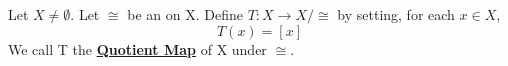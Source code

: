 \label{df:quotient_map}
\newcommand{\QuotientMap}[0]{\textbf{\hyperref[df:quotient_map]{Quotient Map}}\xspace}
    
 \newcommand{\QuotientMapInstance}[3]{ #1 : #2\to #2/#3 }
\begin{df}

    Let $X \neq \emptyset$.
    Let $\cong$ be an 
	\EquivalenceRelation 
	on X.
    Define $T:X \to X/\cong$ by setting, for each $x \in X$, 
    \begin{equation}
        T(x)=[x]
    \end{equation}    
    We call T the \QuotientMap of X under $\cong$. 
\end{df} 
